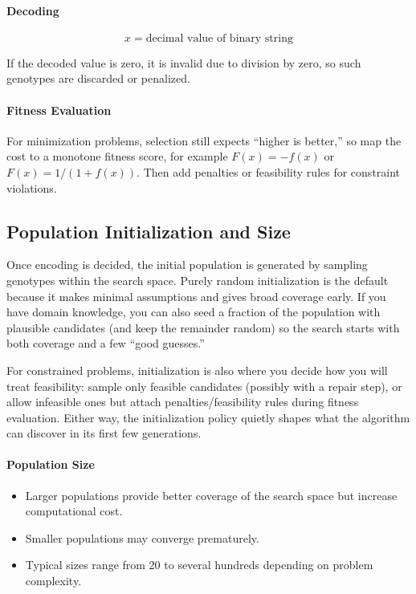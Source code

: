 \paragraph{Decoding}
\[
x = \text{decimal value of binary string}
\]

If the decoded value is zero, it is invalid due to division by zero, so such genotypes are discarded or penalized.

\paragraph{Fitness Evaluation}
\begin{sloppypar}
For minimization problems, selection still expects ``higher is better,'' so map the cost to a monotone fitness score, for example \(F(x)=-f(x)\) or \(F(x)=1/(1+f(x))\). Then add penalties or feasibility rules for constraint violations.
\end{sloppypar}

\subsection{Population Initialization and Size}
\label{sec:evo_population_initialization_and_size}

Once encoding is decided, the initial population is generated by sampling genotypes within the search space. Purely random initialization is the default because it makes minimal assumptions and gives broad coverage early. If you have domain knowledge, you can also seed a fraction of the population with plausible candidates (and keep the remainder random) so the search starts with both coverage and a few ``good guesses.''

For constrained problems, initialization is also where you decide how you will treat feasibility: sample only feasible candidates (possibly with a repair step), or allow infeasible ones but attach penalties/feasibility rules during fitness evaluation. Either way, the initialization policy quietly shapes what the algorithm can discover in its first few generations.

\paragraph{Population Size}
\begin{itemize}
    \item Larger populations provide better coverage of the search space but increase computational cost.
    \item Smaller populations may converge prematurely.
    \item Typical sizes range from 20 to several hundreds depending on problem complexity.
\end{itemize}

